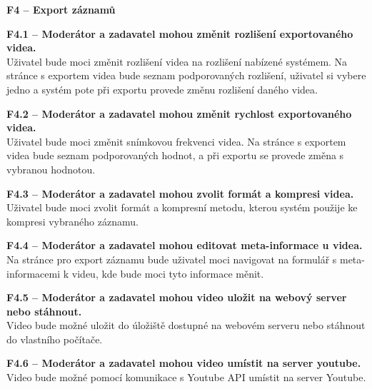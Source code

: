 \documentclass[thesis=M,czech]{FITthesis}[2012/06/26]
\begin{document}
\begin{description}
  \item \textbf{F4 -- Export záznamů}
  \begin{description}
    \item \textbf{F4.1 -- Moderátor a zadavatel mohou změnit rozlišení exportovaného videa.\\}
	Uživatel bude moci změnit rozlišení videa na rozlišení nabízené systémem. Na stránce s exportem videa bude seznam podporovaných rozlišení, uživatel si vybere jedno a systém pote při exportu provede změnu rozlišení daného videa.
    \item \textbf{F4.2 -- Moderátor a zadavatel mohou změnit rychlost exportovaného videa.\\}
	Uživatel bude moci změnit snímkovou frekvenci videa. Na stránce s exportem videa bude seznam podporovaných hodnot, a při exportu se provede změna s vybranou hodnotou.
    \item \textbf{F4.3 -- Moderátor a zadavatel mohou zvolit formát a kompresi videa.\\}
	Uživatel bude moci zvolit formát a kompresní metodu, kterou systém použije ke kompresi vybraného záznamu.
    \item \textbf{F4.4 -- Moderátor a zadavatel mohou editovat meta-informace u videa.\\}
	Na stránce pro export záznamu bude uživatel moci navigovat na formulář s meta-informacemi k videu, kde bude moci tyto informace měnit.
    \item \textbf{F4.5 -- Moderátor a zadavatel mohou video uložit na webový server nebo stáhnout.\\}
	Video bude možné uložit do úložiště dostupné na webovém serveru nebo stáhnout do vlastního počítače.
    \item \textbf{F4.6 -- Moderátor a zadavatel mohou video umístit na server youtube.\\}
	Video bude možné pomocí komunikace s Youtube API umístit na server Youtube.
  \end{description}


\end{description}
\end{document}

